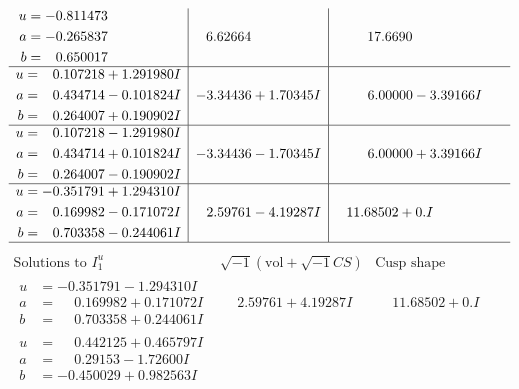 \documentclass[1p]{elsarticle_modified}
\theoremstyle{definition}
\newcommand{\I}{\sqrt{-1}}
\begin{document}
$$\begin{array}{c|c|c}
\begin{aligned}
u &= -0.811473\phantom{ +0.000000I} \\
a &= -0.265837\phantom{ +0.000000I} \\
b &= \phantom{-}0.650017\phantom{ +0.000000I}\end{aligned}
 & \phantom{-}6.62664\phantom{ +0.000000I} & \phantom{-}17.6690\phantom{ +0.000000I} \\ \hline\begin{aligned}
u &= \phantom{-}0.107218 + 1.291980 I \\
a &= \phantom{-}0.434714 - 0.101824 I \\
b &= \phantom{-}0.264007 + 0.190902 I\end{aligned}
 & -3.34436 + 1.70345 I & \phantom{-}6.00000 - 3.39166 I \\ \hline\begin{aligned}
u &= \phantom{-}0.107218 - 1.291980 I \\
a &= \phantom{-}0.434714 + 0.101824 I \\
b &= \phantom{-}0.264007 - 0.190902 I\end{aligned}
 & -3.34436 - 1.70345 I & \phantom{-}6.00000 + 3.39166 I \\ \hline\begin{aligned}
u &= -0.351791 + 1.294310 I \\
a &= \phantom{-}0.169982 - 0.171072 I \\
b &= \phantom{-}0.703358 - 0.244061 I\end{aligned}
 & \phantom{-}2.59761 - 4.19287 I & \phantom{-}11.68502 + 0. I\phantom{ +0.000000I}\\
 \hline 
 \end{array}$$\newpage$$\begin{array}{c|c|c}  
\text{Solutions to }I^u_{1}& \I (\text{vol} + \sqrt{-1}CS) & \text{Cusp shape}\\
 \hline 
\begin{aligned}
u &= -0.351791 - 1.294310 I \\
a &= \phantom{-}0.169982 + 0.171072 I \\
b &= \phantom{-}0.703358 + 0.244061 I\end{aligned}
 & \phantom{-}2.59761 + 4.19287 I & \phantom{-}11.68502 + 0. I\phantom{ +0.000000I} \\ \hline\begin{aligned}
u &= \phantom{-}0.442125 + 0.465797 I \\
a &= \phantom{-}0.29153 - 1.72600 I \\
b &= -0.450029 + 0.982563 I\end{aligned}

\end{array}$$
\end{document}
